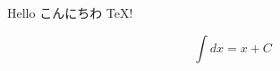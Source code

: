 \documentclass{jsarticle}
\begin{document}
Hello こんにちわ \TeX !

\[ \int dx = x + C \]
\end{document}
